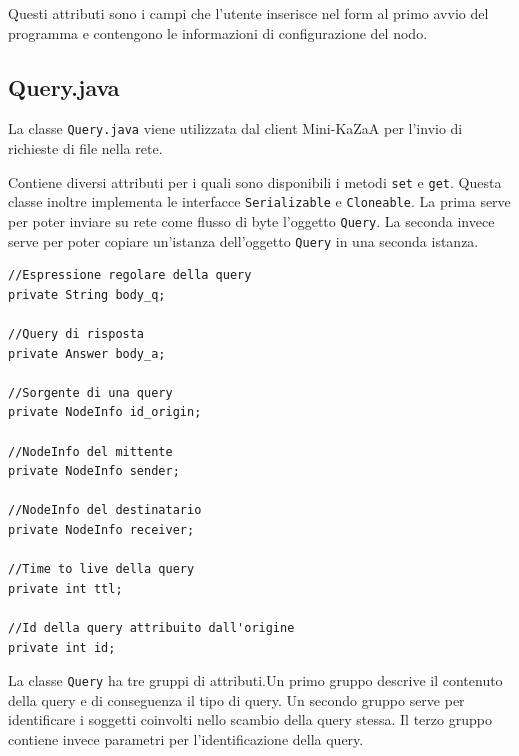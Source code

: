 Questi attributi sono i campi che l'utente inserisce nel form al primo avvio del programma e contengono le informazioni di configurazione del nodo. 

\subsection{Query.java}\label{sec:query}
La classe \verb|Query.java| viene utilizzata dal client Mini-KaZaA per l'invio di richieste di file nella rete.

Contiene diversi attributi per i quali sono disponibili i metodi \verb|set| e \verb|get|. Questa classe inoltre implementa
le interfacce \verb|Serializable| e \verb|Cloneable|.
La prima serve per poter inviare su rete come flusso di byte l'oggetto \verb|Query|. La seconda invece serve per poter
copiare un'istanza dell'oggetto \verb|Query| in una seconda istanza.
\newline
\begin{lstlisting}
//Espressione regolare della query
private String body_q;

//Query di risposta
private Answer body_a;

//Sorgente di una query
private NodeInfo id_origin;

//NodeInfo del mittente
private NodeInfo sender;

//NodeInfo del destinatario
private NodeInfo receiver;

//Time to live della query
private int ttl;

//Id della query attribuito dall'origine
private int id;
\end{lstlisting}

La classe \verb|Query| ha tre gruppi di attributi.Un primo gruppo descrive il contenuto della query e di conseguenza
il tipo di query. Un secondo gruppo serve per identificare i soggetti coinvolti nello scambio della query stessa.
Il terzo gruppo contiene invece parametri per l'identificazione della query. 


